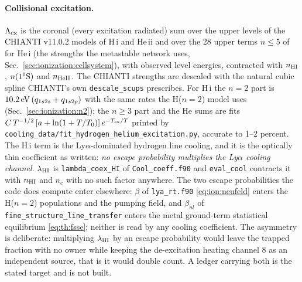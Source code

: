\paragraph{Collisional excitation.} $\Lambda_{\rm cx}$ is the coronal
(every excitation radiated) sum over the upper levels of the CHIANTI v11.0.2
models of H\,{\sc i} and He\,{\sc ii} and over the 28 upper terms $n\le5$ of
\citet[Table~2]{Bray2000} for He\,{\sc i} (the strengths the metastable
network uses, Sec.~\ref{sec:ionization:cellsystem}), with observed level
energies, contracted with $n_{\rm HI}$, $n(1^1{\rm S})$ and $n_{\rm HeII}$.
The CHIANTI strengths are descaled with the natural cubic spline CHIANTI's
own \texttt{descale\_scups} prescribes.
For H\,{\sc i} the $n=2$ part is $10.2\,{\rm eV}\,(q_{1s2s}+q_{1s2p})$ with
the same rates the H($n{=}2$) model uses (Sec.~\ref{sec:ionization:n2}); the
$n\ge3$ part and the He sums are fits
$C\,T^{-1/2}\left[a+\ln(1+T/T_0)\right]e^{-T_{\rm ex}/T}$ printed by
\texttt{cooling\_data/fit\_hydrogen\_helium\_excitation.py}, accurate to
1--2 percent. The H\,{\sc i} term is the Ly$\alpha$-dominated hydrogen line
cooling, and it is the optically thin coefficient as written: \emph{no escape probability multiplies the
Ly$\alpha$ cooling channel.} $\lambda_{\rm HI}$ is
\texttt{lambda\_coex\_HI} of \texttt{Cool\_coeff.f90} and
\texttt{eval\_cool} contracts it with $n_{\rm HI}$ and $n_e$ with no such
factor anywhere. The two escape probabilities the code does compute enter
elsewhere: $\beta$ of \texttt{lya\_rt.f90} \eqref{eq:ion:neufeld} enters the
H($n{=}2$) populations and the pumping field, and $\beta_{ul}$ of
\texttt{fine\_structure\_line\_transfer} enters the metal ground-term
statistical equilibrium \eqref{eq:th:fsse}; neither is read by any cooling
coefficient. The asymmetry is deliberate: multiplying $\lambda_{\rm HI}$ by
an escape probability would leave the trapped fraction with no owner while
keeping the de-excitation heating channel 8 as an independent source, that is
it would double count. A ledger carrying both is the stated target and is not
built.

